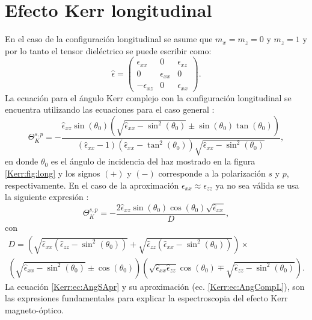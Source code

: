\section{Efecto Kerr longitudinal} \label{Kerr:sec:long}
En el caso de la configuraci\'on longitudinal se asume que $m_x = m_z =0$ y $m_z =1$ y por lo tanto el tensor diel\'ectrico se puede escribir como:
\begin{equation}
\hat{\epsilon}= 
\begin{pmatrix}
\epsilon_{xx} & 0           &\epsilon_{xz} \\
0             &\epsilon_{xx}& 0            \\
-\epsilon_{xz}&0            &\epsilon_{xx} 
\end{pmatrix}.
\label{Kerr:ec:tensDielL}
\end{equation}
La ecuaci\'on para el \'angulo Kerr complejo con la configuraci\'on longitudinal se encuentra utilizando las ecuaciones para el caso general \cite{mo_2004}:
\begin{equation}
\Theta_K^{s,p} =-\frac{\hat{\epsilon}_{xz} \sin (\theta_0) \left(\sqrt{\hat{\epsilon}_{xx}-\sin^2(\theta_0) } \pm \sin(\theta_0) \tan(\theta_0)\right)}{(\hat{\epsilon}_{xx}-1) (\hat{\epsilon}_{xx}-\tan^2 (\theta_0))\sqrt{\hat{\epsilon}_{xx}-\sin^2(\theta_0) }}, \label{Kerr:ec:AngCompL}
\end{equation}
en donde $\theta_0$ es el \'angulo de incidencia del haz mostrado en la figura \ref{Kerr:fig:long} y los signos $(+)$  y $(-)$ corresponde a la polarizaci\'on $s$ y $p$, respectivamente. En el caso de la aproximaci\'on  $\epsilon_{xx} \approx \epsilon_{zz}$ ya no sea v\'alida se usa la siguiente expresi\'on \cite{mo_2004}:
\begin{equation}
\Theta_K^{s,p} = - \frac{2 \hat{\epsilon}_{xz} \sin (\theta_0) \cos(\theta_0) \sqrt{\hat{\epsilon}_{xx}}}{D}, \label{Kerr:ec:AngSApr}
\end{equation}
con
\begin{multline*}
D= \left(\sqrt{\hat{\epsilon}_{xx}(\hat{\epsilon}_{zz}- \sin^2(\theta_0))}+\sqrt{\hat{\epsilon}_{zz}(\hat{\epsilon}_{xx}- \sin^2(\theta_0))} \right) \times \\
\left(\sqrt{\hat{\epsilon}_{xx}- \sin^2(\theta_0)} \pm \cos(\theta_0) \right) \left(\sqrt{\hat{\epsilon}_{xx} \hat{\epsilon}_{zz}} \cos(\theta_0)\mp \sqrt{\hat{\epsilon}_{zz}- \sin^2(\theta_0)}\right).
\end{multline*}
La ecuaci\'on \ref{Kerr:ec:AngSApr} y su aproximaci\'on (ec. \ref{Kerr:ec:AngCompL}), son las expresiones fundamentales para explicar la espectroscopia del efecto Kerr magneto-\'optico.
\endinput 
